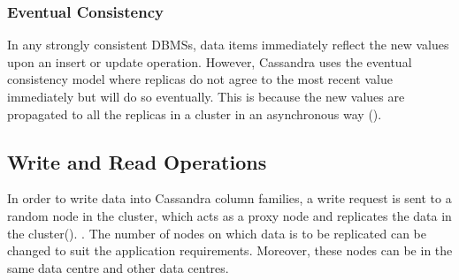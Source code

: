 \subsubsection{Eventual Consistency}
In any strongly consistent  \acp{DBMS}, data items immediately reflect the new
values upon an insert or update operation. However, Cassandra uses the eventual
consistency model where replicas do not agree to the most recent value
immediately but will do so eventually. This is because the new values are
propagated to all the replicas in a cluster in an asynchronous way ().


\subsection{Write and Read Operations}
\label{ss:Background-Cassandra-Operations} 
In order to write data into Cassandra column families,  a write request is sent
to a random node in the cluster,  which acts as a proxy node and replicates the
data in the cluster(). .
The number of nodes on which data is to be replicated can be changed to suit the
application requirements. Moreover, these nodes can be in the same data centre
and other data centres.

